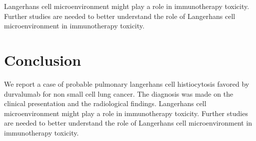 \documentclass{article}
\begin{document}
Langerhans cell microenvironment might play a role in immunotherapy toxicity. Further studies are needed to better understand the role of Langerhans cell microenvironment in immunotherapy toxicity.

\section{Conclusion}
We report a case of probable pulmonary langerhans cell histiocytosis favored by durvalumab for non small cell lung cancer. The diagnosis was made on the clinical presentation and the radiological findings. Langerhans cell microenvironment might play a role in immunotherapy toxicity. Further studies are needed to better understand the role of Langerhans cell microenvironment in immunotherapy toxicity.

\printbibliography
\end{document}
